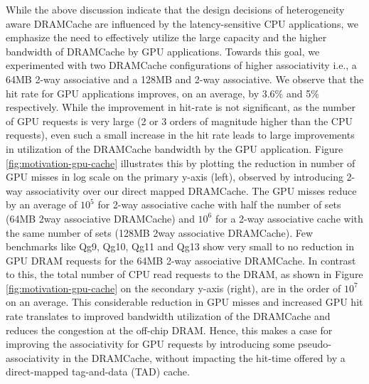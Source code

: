 
While the above discussion indicate that the design decisions of heterogeneity aware DRAMCache are influenced by the latency-sensitive CPU applications, we emphasize the need to effectively utilize the large capacity and the higher bandwidth of DRAMCache by GPU applications. Towards this goal, we experimented with two DRAMCache configurations of higher associativity i.e., a 64MB 2-way associative and a 128MB and 2-way associative. We observe that the hit rate for GPU applications improves, on an average, by 3.6\% and 5\% respectively. While the improvement in hit-rate is not significant, as the number of GPU requests is very large (2 or 3 orders of magnitude higher than the CPU requests), even such a small increase in the hit rate leads to large improvements in utilization of the DRAMCache bandwidth by the GPU application. Figure \ref{fig:motivation-gpu-cache} illustrates this by plotting the reduction in number of GPU misses in log scale on the primary y-axis (left), observed by introducing 2-way associativity over our direct mapped DRAMCache. The GPU misses reduce by an average of $10^5$ for 2-way associative cache with half the number of sets (64MB 2way associative DRAMCache) and $10^6$ for a 2-way associative cache with the same number of sets (128MB 2way associative DRAMCache). Few benchmarks like Qg9, Qg10, Qg11 and Qg13 show very small to no reduction in GPU DRAM requests for the 64MB 2-way associative DRAMCache. 
In contrast to this, the total number of CPU read requests to the DRAM, as shown in Figure \ref{fig:motivation-gpu-cache} on the secondary y-axis (right), are in the order of $10^7$ on an average. This considerable reduction in GPU misses and increased GPU hit rate translates to improved bandwidth utilization of the DRAMCache and reduces the congestion at the off-chip DRAM. Hence, this makes a case for improving the associativity for GPU requests by introducing some pseudo-associativity in the DRAMCache, without impacting the hit-time offered by a direct-mapped tag-and-data (TAD) cache.

